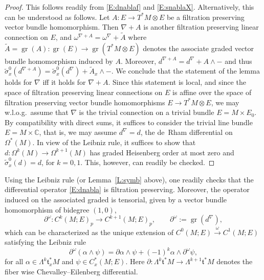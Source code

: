 \documentclass[reqno,12pt]{amsart}
\DeclareMathOperator{\gr}{gr}
\newcommand\C{\mathbb C}
\theoremstyle{plain}
\theoremstyle{definition}
\begin{document}
\begin{proof}
This follows readily from  \eqref{E:dnablaf} and \eqref{E:snablaX}.
Alternatively, this can be understood as follows.
Let $A\colon E\to T^*M\otimes E$ be a filtration preserving vector bundle homomorphism. 
Then $\nabla+A$ is another filtration preserving linear connection on $E$, and $\omega^{\nabla+A}=\omega^\nabla+\tilde A$ where $\tilde A=\gr(A)\colon\gr(E)\to\gr(T^*M\otimes E)$ denotes the associate graded vector bundle homomorphism induced by $A$.
Moreover, $d^{\nabla+A}=d^\nabla+A\wedge-$ and thus $\tilde\sigma^0_x(d^{\nabla+A})=\tilde\sigma^0_x(d^\nabla)+\tilde A_x\wedge-$.
We conclude that the statement of the lemma holds for $\nabla$ iff it holds for $\nabla+A$.
Since this statement is local, and since the space of filtration preserving linear connections on $E$ is affine over the space of filtration preserving vector bundle homomorphisms $E\to T^*M\otimes E$, we may w.l.o.g.\ assume that $\nabla$ is the trivial connection on a trivial bundle $E=M\times E_0$.
By compatibility with direct sums, it suffices to consider the trivial line bundle $E=M\times\C$, that is, we may assume $d^\nabla=d$, the de~Rham differential on $\Omega^*(M)$.
In view of the Leibniz rule, it suffices to show that $d\colon\Omega^k(M)\to\Omega^{k+1}(M)$ has graded Heisenberg order at most zero and $\tilde\sigma^0_x(d)=d$, for $k=0,1$.
This, however, can readily be checked.
\end{proof}


Using the Leibniz rule (or Lemma~\ref{L:symb} above), one readily checks that the differential operator \eqref{E:dnabla} is filtration preserving.
Moreover, the operator induced on the associated graded is tensorial, given by a vector bundle homomorphism of bidegree $(1,0)$,
\begin{equation}\label{E:delomega}
\partial^\omega\colon C^k(M;E)_p\to C^{k+1}(M;E)_p,\qquad
\partial^\omega:=\gr(d^\nabla),
\end{equation}
which can be characterized as the unique extension of $C^0(M;E)\xrightarrow\omega C^1(M;E)$ satisfying the Leibniz rule
\begin{equation}\label{E:leibdel}
\partial^\omega(\alpha\wedge\psi)
=\partial\alpha\wedge\psi+(-1)^k\alpha\wedge \partial^\omega\psi,
\end{equation}
for all $\alpha\in\Lambda^k\mathfrak t^*_xM$ and $\psi\in C_x^*(M;E)$.
Here $\partial\colon\Lambda^k\mathfrak t^*M\to\Lambda^{k+1}\mathfrak t^*M$ denotes the fiber wise Chevalley--Eilenberg differential.
\end{document}
